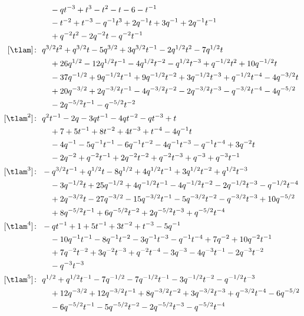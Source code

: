 \begin{align*}
& \quad -q t^{-3} +t^{3} -t^{2} -t -6 -t^{-1} \\
& \quad -t^{-2} +t^{-3} -q^{-1} t^{3} +2 q^{-1} t +3 q^{-1} +2 q^{-1} t^{-1} \\
& \quad +q^{-2} t^{2} -2 q^{-2} t -q^{-2} t^{-1} \\
[\tlam]\colon\ & q^{3/2} t^{2} +q^{3/2} t -5 q^{3/2} +3 q^{3/2} t^{-1} -2 q^{1/2} t^{2} -7 q^{1/2} t \\
& \quad +26 q^{1/2} -12 q^{1/2} t^{-1} -4 q^{1/2} t^{-2} -q^{1/2} t^{-3} +q^{-1/2} t^{2} +10 q^{-1/2} t \\
& \quad -37 q^{-1/2} +9 q^{-1/2} t^{-1} +9 q^{-1/2} t^{-2} +3 q^{-1/2} t^{-3} +q^{-1/2} t^{-4} -4 q^{-3/2} t \\
& \quad +20 q^{-3/2} +2 q^{-3/2} t^{-1} -4 q^{-3/2} t^{-2} -2 q^{-3/2} t^{-3} -q^{-3/2} t^{-4} -4 q^{-5/2} \\
& \quad -2 q^{-5/2} t^{-1} -q^{-5/2} t^{-2} \\
[\tlam^{2}]\colon\ & q^{2} t^{-1} -2 q -3 q t^{-1} -4 q t^{-2} -q t^{-3} +t \\
& \quad +7 +5 t^{-1} +8 t^{-2} +4 t^{-3} +t^{-4} -4 q^{-1} t \\
& \quad -4 q^{-1} -5 q^{-1} t^{-1} -6 q^{-1} t^{-2} -4 q^{-1} t^{-3} -q^{-1} t^{-4} +3 q^{-2} t \\
& \quad -2 q^{-2} +q^{-2} t^{-1} +2 q^{-2} t^{-2} +q^{-2} t^{-3} +q^{-3} +q^{-3} t^{-1} \\
[\tlam^{3}]\colon\ & -q^{3/2} t^{-1} +q^{1/2} t -8 q^{1/2} +4 q^{1/2} t^{-1} +3 q^{1/2} t^{-2} +q^{1/2} t^{-3} \\
& \quad -3 q^{-1/2} t +25 q^{-1/2} +4 q^{-1/2} t^{-1} -4 q^{-1/2} t^{-2} -2 q^{-1/2} t^{-3} -q^{-1/2} t^{-4} \\
& \quad +2 q^{-3/2} t -27 q^{-3/2} -15 q^{-3/2} t^{-1} -5 q^{-3/2} t^{-2} -q^{-3/2} t^{-3} +10 q^{-5/2} \\
& \quad +8 q^{-5/2} t^{-1} +6 q^{-5/2} t^{-2} +2 q^{-5/2} t^{-3} +q^{-5/2} t^{-4} \\
[\tlam^{4}]\colon\ & -q t^{-1} +1 +5 t^{-1} +3 t^{-2} +t^{-3} -5 q^{-1} \\
& \quad -10 q^{-1} t^{-1} -8 q^{-1} t^{-2} -3 q^{-1} t^{-3} -q^{-1} t^{-4} +7 q^{-2} +10 q^{-2} t^{-1} \\
& \quad +7 q^{-2} t^{-2} +3 q^{-2} t^{-3} +q^{-2} t^{-4} -3 q^{-3} -4 q^{-3} t^{-1} -2 q^{-3} t^{-2} \\
& \quad -q^{-3} t^{-3} \\
[\tlam^{5}]\colon\ & q^{1/2} +q^{1/2} t^{-1} -7 q^{-1/2} -7 q^{-1/2} t^{-1} -3 q^{-1/2} t^{-2} -q^{-1/2} t^{-3} \\
& \quad +12 q^{-3/2} +12 q^{-3/2} t^{-1} +8 q^{-3/2} t^{-2} +3 q^{-3/2} t^{-3} +q^{-3/2} t^{-4} -6 q^{-5/2} \\
& \quad -6 q^{-5/2} t^{-1} -5 q^{-5/2} t^{-2} -2 q^{-5/2} t^{-3} -q^{-5/2} t^{-4}
\end{align*}

